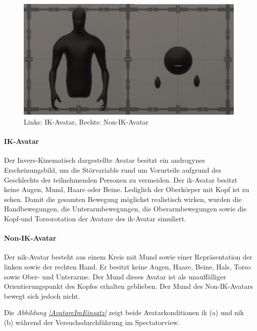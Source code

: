 \documentclass[a4paper,11pt]{article}%
\renewcommand{\\}{\vspace*{0.5\baselineskip} \newline}
\begin{document}
	\begin{figure}[H]
		\begin{footnotesize}
		\centering
			\includegraphics[scale=0.6]{Abbildungen/Avatars.JPG}\\
			\caption[Abbildung 1]{Links: IK-Avatar, Rechts: Non-IK-Avatar}
			\label{AvatareAussehen}
		\end{footnotesize}
	\end{figure}
		\paragraph{IK-Avatar}
Der Invers-Kinematisch dargestellte Avatar besitzt ein androgynes Erscheinungsbild, um die Störvariable rund um Vorurteile aufgrund des Geschlechts der teilnehmenden Personen zu vermeiden. Der \ac{ik}-Avatar besitzt keine Augen, Mund, Haare oder Beine. Lediglich der Oberkörper mit Kopf ist zu sehen.
Damit die gesamten Bewegung möglichst realistisch wirken, wurden die Handbewegungen, die Unterarmbewegungen, die Oberarmbewegungen sowie die Kopf-und Torsorotation der Avatare des \ac{ik}-Avatar simuliert.

		\paragraph{Non-IK-Avatar}
Der \ac{nik}-Avatar besteht aus einem Kreis mit Mund sowie einer Repräsentation der linken sowie der rechten Hand. Er besitzt keine Augen, Haare, Beine, Hals, Torso sowie Ober- und Unterarme. Der Mund dieses Avatar ist als unauffälliger Orientierungspunkt des Kopfes erhalten geblieben. Der Mund des Non-IK-Avatars bewegt sich jedoch nicht. 
\newpage

Die \textit{Abbildung \ref{AvatareImEinsatz}} zeigt beide Avatarkonditionen \ac{ik} (a) und \ac{nik} (b) während der Versuchsdurchführung im Spectatorview.
\end{document}
